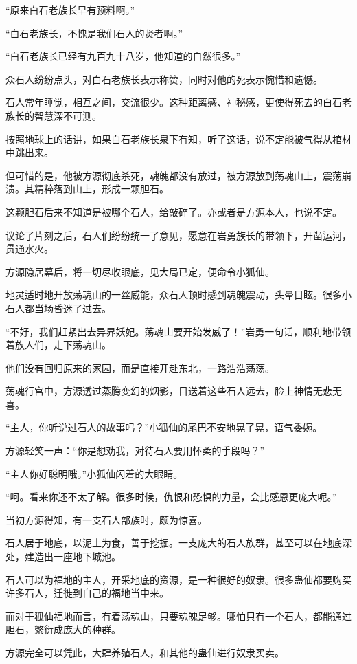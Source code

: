 \begin{this_body}
“原来白石老族长早有预料啊。”

“白石老族长，不愧是我们石人的贤者啊。”

“白石老族长已经有九百九十八岁，他知道的自然很多。”

众石人纷纷点头，对白石老族长表示称赞，同时对他的死表示惋惜和遗憾。

石人常年睡觉，相互之间，交流很少。这种距离感、神秘感，更使得死去的白石老族长的智慧深不可测。

按照地球上的话讲，如果白石老族长泉下有知，听了这话，说不定能被气得从棺材中跳出来。

但可惜的是，他被方源彻底杀死，魂魄都没有放过，被方源放到荡魂山上，震荡崩溃。其精粹落到山上，形成一颗胆石。

这颗胆石后来不知道是被哪个石人，给敲碎了。亦或者是方源本人，也说不定。

议论了片刻之后，石人们纷纷统一了意见，愿意在岩勇族长的带领下，开凿运河，贯通水火。

方源隐居幕后，将一切尽收眼底，见大局已定，便命令小狐仙。

地灵适时地开放荡魂山的一丝威能，众石人顿时感到魂魄震动，头晕目眩。很多小石人都当场昏迷了过去。

“不好，我们赶紧出去异界妖妃。荡魂山要开始发威了！”岩勇一句话，顺利地带领着族人们，走下荡魂山。

他们没有回归原来的家园，而是直接开赴东北，一路浩浩荡荡。

荡魂行宫中，方源透过蒸腾变幻的烟影，目送着这些石人远去，脸上神情无悲无喜。

“主人，你听说过石人的故事吗？”小狐仙的尾巴不安地晃了晃，语气委婉。

方源轻笑一声：“你是想劝我，对待石人要用怀柔的手段吗？”

“主人你好聪明哦。”小狐仙闪着的大眼睛。

“呵。看来你还不太了解。很多时候，仇恨和恐惧的力量，会比感恩更庞大呢。”

当初方源得知，有一支石人部族时，颇为惊喜。

石人居于地底，以泥土为食，善于挖掘。一支庞大的石人族群，甚至可以在地底深处，建造出一座地下城池。

石人可以为福地的主人，开采地底的资源，是一种很好的奴隶。很多蛊仙都要购买许多石人，迁徙到自己的福地当中来。

而对于狐仙福地而言，有着荡魂山，只要魂魄足够。哪怕只有一个石人，都能通过胆石，繁衍成庞大的种群。

方源完全可以凭此，大肆养殖石人，和其他的蛊仙进行奴隶买卖。


\end{this_body}
